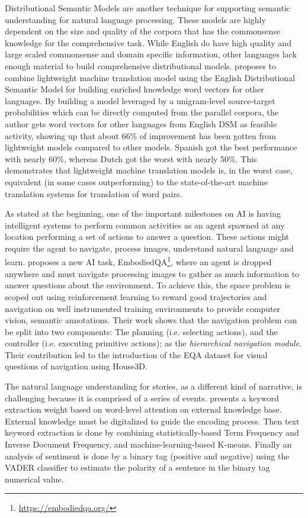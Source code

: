 \documentclass[runningheads]{llncs}
\begin{document}
Distributional Semantic Models are another technique for supporting semantic understanding for natural language processing. These models are highly dependent on the size and quality of the corpora that has the commonsense knowledge for the comprehensive task. While English do have high quality and large scaled commonsense and domain specific information, other languages lack enough material to build comprehensive distributional models. \cite{Barzegar2018} proposes to combine lightweight machine translation model using the English Distributional Semantic Model for building enriched knowledge word vectors for other languages. By building a model leveraged by a unigram-level source-target probabilities which can be directly computed from the parallel corpora, the author gets word vectors for other languages from English DSM as feasible activity, showing up that about 66\% of improvement has been gotten from lightweight models compared to other models. Spanish got the best performance with nearly 60\%, whereas Dutch got the worst with nearly 50\%. This demonstrates that lightweight machine translation models is, in the worst case, equivalent (in some cases outperforming) to the state-of-the-art machine translation systems for translation of word pairs.

As stated at the beginning, one of the important milestones on AI is having intelligent systems to perform common activities as an agent spawned at any location performing a set of actions to answer a question. These actions might require the agent to navigate, process images, understand natural language and learn. \cite{Das2018} proposes a new AI task, EmbodiedQA\footnote{\url{https://embodiedqa.org/}}, where an agent is dropped anywhere and must navigate processing images to gather as much information to answer questions about the environment. To achieve this, the space problem is scoped out using reinforcement learning to reward good trajectories and navigation on well instrumented training environments to provide computer vision, semantic annotations. Their work shows that the navigation problem can be split into two components: The planning (i.e. selecting actions), and the controller (i.e. executing primitive actions); as the \emph{hierarchical navigation module}. Their contribution led to the introduction of the EQA dataset for visual questions of navigation using House3D.

The natural language understanding for stories, as a different kind of narrative, is challenging because it is comprised of a series of events. \cite{Yuan2018} presents a keyword extraction weight based on word-level attention on external knowledge base. External knowledge must be digitalized to guide the encoding process. Then text keyword extraction is done by combining statistically-based Term Frequency and Inverse Document Frequency, and machine-learning-based K-means. Finally an analysis of sentiment is done by a binary tag (positive and negative) using the VADER classifier to estimate the polarity of a sentence in the binary tag numerical value.
\end{document}
